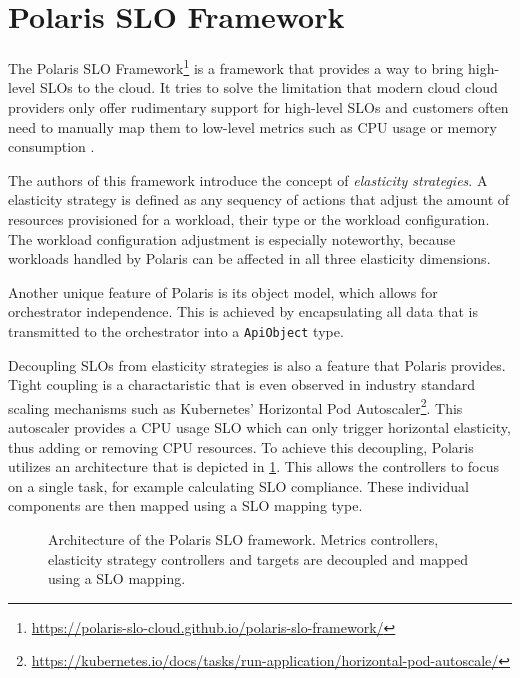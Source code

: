 \section{Polaris SLO Framework}
\label{sec:polaris}

The Polaris SLO Framework\footnote{\url{https://polaris-slo-cloud.github.io/polaris-slo-framework/}} is a framework that provides a way to bring high-level SLOs to the cloud. It tries to solve the limitation that modern cloud cloud providers only offer rudimentary support for high-level SLOs and customers often need to manually map them to low-level metrics such as CPU usage or memory consumption \cite{pusztaiSLOScriptNovel2021}.

The authors of this framework introduce the concept of \textit{elasticity strategies}. A elasticity strategy is defined as any sequency of actions that adjust the amount of resources provisioned for a workload, their type or the workload configuration. The workload configuration adjustment is especially noteworthy, because workloads handled by Polaris can be affected in all three elasticity dimensions.

Another unique feature of Polaris is its object model, which allows for orchestrator independence. This is achieved by encapsulating all data that is transmitted to the orchestrator into a \texttt{ApiObject} type.

Decoupling SLOs from elasticity strategies is also a feature that Polaris provides. Tight coupling is a charactaristic that is even observed in industry standard scaling mechanisms such as Kubernetes' Horizontal Pod Autoscaler\footnote{\raggedright\url{https://kubernetes.io/docs/tasks/run-application/horizontal-pod-autoscale/}}. This autoscaler provides a CPU usage SLO which can only trigger horizontal elasticity, thus adding or removing CPU resources. To achieve this decoupling, Polaris utilizes an architecture that is depicted in \cref{fig:polaris-architecture}. This allows the controllers to focus on a single task, for example calculating SLO compliance. These individual components are then mapped using a SLO mapping type.

\begin{figure}
    \centering
    \caption{Architecture of the Polaris SLO framework. Metrics controllers, elasticity strategy controllers and targets are decoupled and mapped using a SLO mapping.}
    \label{fig:polaris-architecture}
\end{figure}

